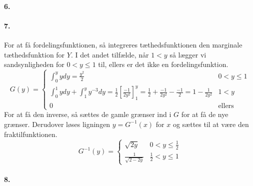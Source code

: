\documentclass[12pt]{article}
\begin{document}
\paragraph{6.}
\paragraph{7.}
For at få fordelingsfunktionen, så integreres tæthedsfunktionen den marginale tæthedsfunktion for $Y$. I det andet tilfælde, når $1 < y$ så lægger vi sandsynligheden for $0 < y \leq 1$ til, ellers er det ikke en fordelingsfunktion.
\[
    G(y) =
    \begin{cases}
        \int_0^y y dy = \frac{y^2}{2} & 0<y\leq 1\\
        \int_0^1 y dy + \int_1^y y^{-3} dy = \frac{1}{2}\left[ \frac{-1}{2y^2} \right]_1^y = \frac{1}{2} + \frac{-1}{2y^2} - \frac{-1}{2} = 1-\frac{1}{2y^2} & 1 < y \\
        0 &\text{ellers}
    \end{cases}
\]
For at få den inverse, så sættes de gamle grænser ind i $G$ for at få de nye grænser. Derudover løses ligningen $y = G^{-1}(x)$ for $x$ og sættes til at være den fraktilfunktionen.
\[
    G^{-1}(y) =
    \begin{cases}
        \sqrt{2y} & 0 < y \leq \frac{1}{2} \\
        \frac{1}{\sqrt{2-2y}} & \frac{1}{2} < y \leq 1
    \end{cases}
\]
\paragraph{8.}
\end{document}
